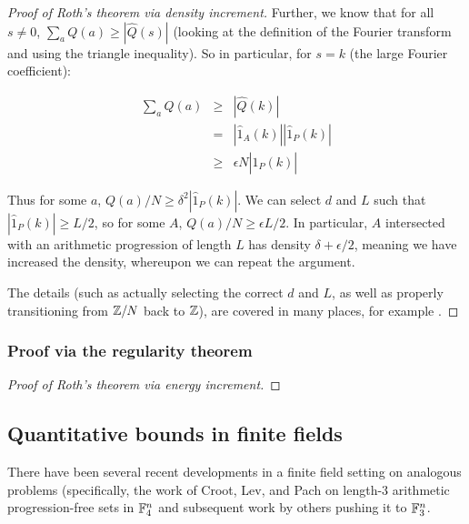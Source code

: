\documentclass{article}
\theoremstyle{definition}
\theoremstyle{remark}
\numberwithin{equation}{section}
\begin{document}
\begin{proof}[Proof of Roth's theorem via density increment]
  Further, we know that for all $s \neq 0$,
  $\sum_a Q(a) \geq |\hat Q(s)|$ (looking at the definition of the
  Fourier transform and using the triangle inequality).  So in
  particular, for $s = k$ (the large Fourier coefficient):

\begin{eqnarray*}
  \sum_a Q(a) &\geq& |\hat Q(k)| \\
              &=& |\hat 1_A(k)| |\hat 1_P(k)| \\
              &\geq& \epsilon N |\hat 1_P(k)| 
\end{eqnarray*}

Thus for some $a$, $Q(a)/N \geq \delta^2 |\hat 1_P(k)|$.  We can
select $d$ and $L$ such that $|\hat 1_P(k)| \geq L/2$, so for some
$A$, $Q(a)/N \geq \epsilon L/2$.  In particular, $A$ intersected with
an arithmetic progression of length $L$ has density
$\delta + \epsilon/2$, meaning we have increased the density,
whereupon we can repeat the argument.

The details (such as actually selecting the correct $d$ and $L$, as
well as properly transitioning from $\mathbb{Z}/N$ back to $\mathbb{Z}$), are covered
in many places, for example \cite{lyall_roth}.

\end{proof}

\subsubsection{Proof via the regularity theorem}



\begin{proof}[Proof of Roth's theorem via energy increment]

\end{proof}


\subsection{Quantitative bounds in finite fields}

There have been several recent developments in a finite field setting
on analogous problems (specifically, the work of Croot, Lev, and Pach
\cite{progressions_croot} on length-3 arithmetic progression-free sets
in $\mathbb{F}_4^n$ and subsequent work by others \cite{capset_ellenberg}
pushing it to $\mathbb{F}_3^n$.
\end{document}
